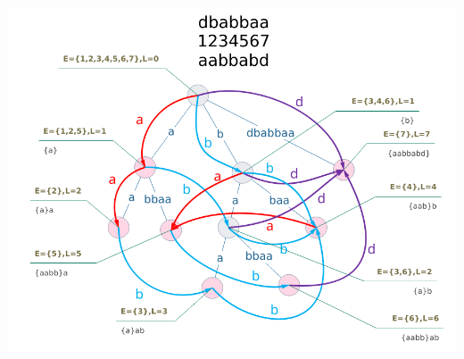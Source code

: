 \documentclass[9pt]{ctexart}
\begin{document}
\begin{landscape}
\begin{multicols}{2}
\end{multicols}
\end{landscape}

\begin{center}
\includegraphics[width=0.8\linewidth]{assets/sam.png}
\end{center}
\end{document}
